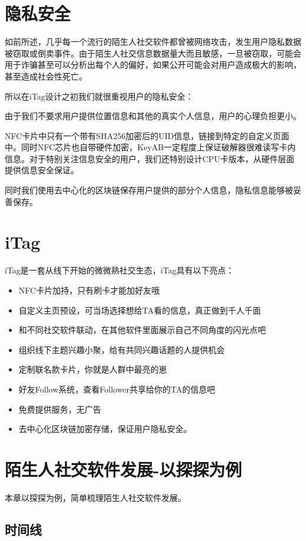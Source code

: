 \documentclass[UTF8]{ctexart}
\begin{document}
\section{隐私安全}

如前所述，几乎每一个流行的陌生人社交软件都曾被网络攻击，发生用户隐私数据被窃取或倒卖事件。由于陌生人社交信息数据量大而且敏感，一旦被窃取，可能会用于诈骗甚至可以分析出每个人的偏好，如果公开可能会对用户造成极大的影响，甚至造成社会性死亡。

所以在iTag设计之初我们就很重视用户的隐私安全：

由于我们不要求用户提供位置信息和其他的真实个人信息，用户的心理负担更小。

NFC卡片中只有一个带有SHA256加密后的UID信息，链接到特定的自定义页面中。同时NFC芯片也自带硬件加密，KeyAB一定程度上保证破解器很难读写卡内信息。对于特别关注信息安全的用户，我们还特别设计CPU卡版本，从硬件层面提供信息安全保证。

同时我们使用去中心化的区块链保存用户提供的部分个人信息，隐私信息能够被妥善保存。

\section{iTag}
iTag是一套从线下开始的微微熟社交生态，iTag具有以下亮点：

\begin{itemize}
    \item NFC卡片加持，只有刷卡才能加好友哦
    \item 自定义主页预设，可当场选择想给TA看的信息，真正做到千人千面
    \item 和不同社交软件联动，在其他软件里面展示自己不同角度的闪光点吧
    \item 组织线下主题兴趣小聚，给有共同兴趣话题的人提供机会
    \item 定制联名款卡片，你就是人群中最亮的崽
    \item 好友Follow系统，查看Follower共享给你的TA的信息吧~
    \item 免费提供服务，无广告
    \item 去中心化区块链加密存储，保证用户隐私安全。
\end{itemize}

\section{陌生人社交软件发展-以探探为例}
本章以探探为例，简单梳理陌生人社交软件发展。

\subsection{时间线}
\end{document}
